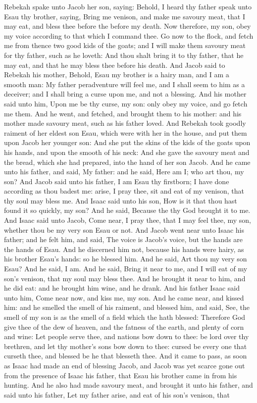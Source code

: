  Rebekah spake unto Jacob her son, saying: Behold, I heard thy father speak unto Esau thy brother, saying, Bring me venison, and make me savoury meat, that I may eat, and bless thee before the  before my death. Now therefore, my son, obey my voice according to that which I command thee. Go now to the flock, and fetch me from thence two good kids of the goats; and I will make them savoury meat for thy father, such as he loveth: And thou shalt bring it to thy father, that he may eat, and that he may bless thee before his death. And Jacob said to Rebekah his mother, Behold, Esau my brother is a hairy man, and I am a smooth man: My father peradventure will feel me, and I shall seem to him as a deceiver; and I shall bring a curse upon me, and not a blessing. And his mother said unto him, Upon me be thy curse, my son: only obey my voice, and go fetch me them. And he went, and fetched, and brought them to his mother: and his mother made savoury meat, such as his father loved. And Rebekah took goodly raiment of her eldest son Esau, which were with her in the house, and put them upon Jacob her younger son: And she put the skins of the kids of the goats upon his hands, and upon the smooth of his neck: And she gave the savoury meat and the bread, which she had prepared, into the hand of her son Jacob. And he came unto his father, and said, My father: and he said, Here am I; who art thou, my son? And Jacob said unto his father, I am Esau thy firstborn; I have done according as thou badest me: arise, I pray thee, sit and eat of my venison, that thy soul may bless me. And Isaac said unto his son, How is it that thou hast found it so quickly, my son? And he said, Because the  thy God brought it to me. And Isaac said unto Jacob, Come near, I pray thee, that I may feel thee, my son, whether thou be my very son Esau or not. And Jacob went near unto Isaac his father; and he felt him, and said, The voice is Jacob's voice, but the hands are the hands of Esau. And he discerned him not, because his hands were hairy, as his brother Esau's hands: so he blessed him. And he said, Art thou my very son Esau? And he said, I am. And he said, Bring it near to me, and I will eat of my son's venison, that my soul may bless thee. And he brought it near to him, and he did eat: and he brought him wine, and he drank. And his father Isaac said unto him, Come near now, and kiss me, my son. And he came near, and kissed him: and he smelled the smell of his raiment, and blessed him, and said, See, the smell of my son is as the smell of a field which the  hath blessed: Therefore God give thee of the dew of heaven, and the fatness of the earth, and plenty of corn and wine: Let people serve thee, and nations bow down to thee: be lord over thy brethren, and let thy mother's sons bow down to thee: cursed be every one that curseth thee, and blessed be he that blesseth thee. And it came to pass, as soon as Isaac had made an end of blessing Jacob, and Jacob was yet scarce gone out from the presence of Isaac his father, that Esau his brother came in from his hunting. And he also had made savoury meat, and brought it unto his father, and said unto his father, Let my father arise, and eat of his son's venison, that 
